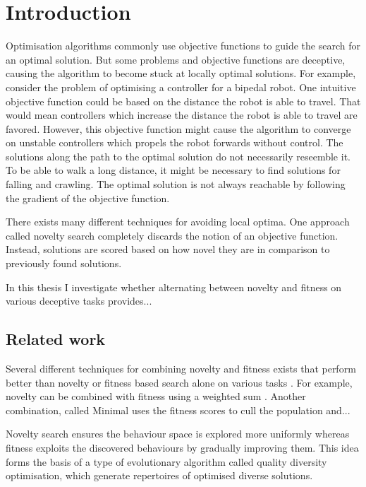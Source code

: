 \section{Introduction}



\label{sec:intro}

Optimisation algorithms commonly use objective functions to guide the search for an optimal solution.
But some problems and objective functions are deceptive, causing the algorithm to become stuck at
locally optimal solutions. For example, consider the problem of optimising a controller for a bipedal
robot. One intuitive objective function could be based on the distance the robot is able to travel. That
would mean controllers which increase the distance the robot is able to travel are favored. However,
this objective function might cause the algorithm to converge on unstable controllers which
propels the robot forwards without control. The solutions along the path to the optimal solution do not
necessarily reseemble it. To be able to walk a long distance, it might be necessary to find solutions for
falling and crawling. The optimal solution is not always reachable by following the gradient of the
objective function.

There exists many different techniques for avoiding local optima. One approach called novelty search
completely discards the notion of an objective function. Instead, solutions are scored based on how novel
they are in comparison to previously found solutions.

In this thesis I investigate whether alternating between novelty and fitness on various deceptive tasks provides...

\todo{}


\subsection{Related work}
Several different techniques for combining novelty and fitness exists that perform better than novelty or
fitness based search alone on various tasks \cite{ns_study}. For example, novelty can be combined with fitness using a weighted sum \cite{}.
Another combination, called Minimal  uses the fitness scores to cull the population and...

Novelty search ensures the behaviour space is explored more uniformly whereas fitness exploits the discovered behaviours
by gradually improving them. This idea forms the basis of a type of evolutionary algorithm called quality diversity optimisation,
which generate repertoires of optimised diverse solutions.

